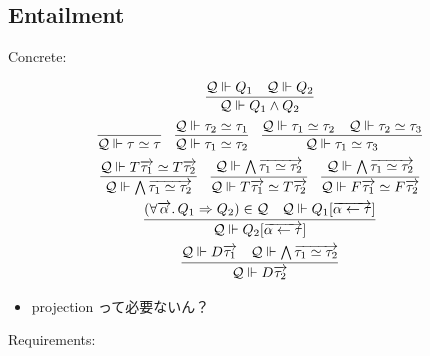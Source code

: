 \subsection{Entailment}

Concrete:

\begin{gather*}
  \infer{\mathcal{Q} \Vdash Q_1 \land Q_2}{
    \mathcal{Q} \Vdash Q_1
    &
    \mathcal{Q} \Vdash Q_2
  }
  \\
  \infer{\mathcal{Q} \Vdash \tau \simeq \tau}{}
  \hspace{1em}
  \infer{\mathcal{Q} \Vdash \tau_1 \simeq \tau_2}{
    \mathcal{Q} \Vdash \tau_2 \simeq \tau_1
  }
  \hspace{1em}
  \infer{\mathcal{Q} \Vdash \tau_1 \simeq \tau_3}{
    \mathcal{Q} \Vdash \tau_1 \simeq \tau_2
    &
    \mathcal{Q} \Vdash \tau_2 \simeq \tau_3
  }
  \\
  \infer{\mathcal{Q} \Vdash \bigwedge \overrightarrow{\tau_1 \simeq \tau_2}}{
    \mathcal{Q} \Vdash T\overrightarrow{\tau_1} \simeq T\overrightarrow{\tau_2}
  }
  \hspace{1em}
  \infer{\mathcal{Q} \Vdash T\overrightarrow{\tau_1} \simeq T\overrightarrow{\tau_2}}{
    \mathcal{Q} \Vdash \bigwedge \overrightarrow{\tau_1 \simeq \tau_2}
  }
  \hspace{1em}
  \infer{\mathcal{Q} \Vdash F\overrightarrow{\tau_1} \simeq F\overrightarrow{\tau_2}}{
    \mathcal{Q} \Vdash \bigwedge \overrightarrow{\tau_1 \simeq \tau_2}
  }
  \\
  \infer{\mathcal{Q} \Vdash Q_2[\overrightarrow{\alpha \assign \tau}]}{
    (\forall \overrightarrow{\alpha}\ldotp Q_1 \Rightarrow Q_2) \in \mathcal{Q}
    &
    \mathcal{Q} \Vdash Q_1[\overrightarrow{\alpha \assign \tau}]
  }
  \\
  \infer{\mathcal{Q} \Vdash D \overrightarrow{\tau_2}}{
    \mathcal{Q} \Vdash D \overrightarrow{\tau_1}
    &
    \mathcal{Q} \Vdash \bigwedge \overrightarrow{\tau_1 \simeq \tau_2}
  }
\end{gather*}

\begin{itemize}
  \item projection って必要ないん？
\end{itemize}

Requirements:

